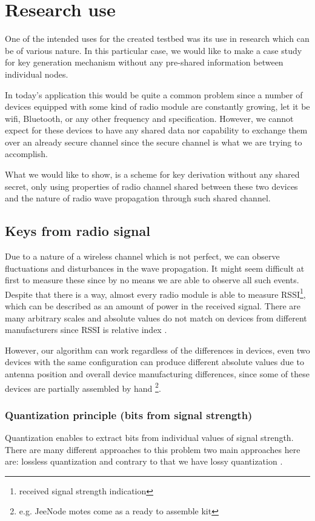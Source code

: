 \documentclass[
  print, %
  table,   %
  nolof,     %
  nolot,     %
           oneside
]{fithesis3}
\begin{document}
\chapter{Research use}\label{ch:research}
  One of the intended uses for the created testbed was its use in research which can be of various nature. In this particular case, we would like to make a case study for key generation mechanism without any pre-shared information between individual nodes.

  In today's application this would be quite a common problem since a number of devices equipped with some kind of radio module are constantly growing, let it be wifi, Bluetooth, or any other frequency and specification. However, we cannot expect for these devices to have any shared data nor capability to exchange them over an already secure channel since the secure channel is what we are trying to accomplish.

  What we would like to show, is a scheme for key derivation without any shared secret, only using properties of radio channel shared between these two devices and the nature of radio wave propagation through such shared channel.

  \section{Keys from radio signal}
  Due to a nature of a wireless channel which is not perfect, we can observe fluctuations and disturbances in the wave propagation. It might seem difficult at first to measure these since by no means we are able to observe all such events. Despite that there is a way, almost every radio module is able to measure RSSI\footnote{received signal strength indication}, which can be described as an amount of power in the received signal. There are many arbitrary scales and absolute values do not match on devices from different manufacturers since RSSI is relative index \cite{RSSIMeaning}.

  However, our algorithm can work regardless of the differences in devices, even two devices with the same configuration can produce different absolute values due to antenna position and overall device manufacturing differences, since some of these devices are partially assembled by hand \footnote{e.g. JeeNode motes come as a ready to assemble kit}.

  \subsection{Quantization principle (bits from signal strength)}
    Quantization enables to extract bits from individual values of signal strength. There are many different approaches to this problem \cite{Jana2009Rssi}
    two main approaches here are: lossless quantization \cite{Azimi-Sadjadi2010Fading}
    and contrary to that we have lossy quantization \cite{Mathur2008Rssi}. %
\end{document}
